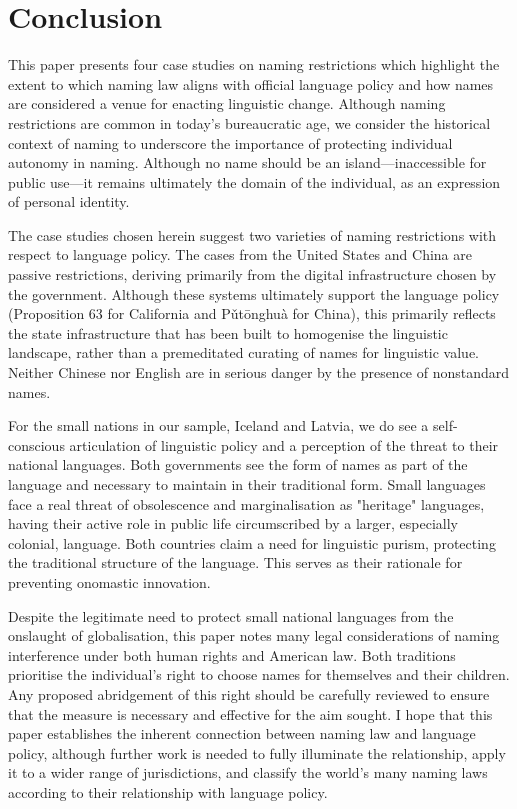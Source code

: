 \section{Conclusion}

This paper presents four case studies on naming restrictions which highlight
the extent to which naming law aligns with official language policy and how
names are considered a venue for enacting linguistic change. Although naming
restrictions are common in today's bureaucratic age, we consider the historical
context of naming to underscore the importance of protecting individual
autonomy in naming. Although no name should be an island---inaccessible for
public use---it remains ultimately the domain of the individual, as an
expression of personal identity.

The case studies chosen herein suggest two varieties of naming restrictions
with respect to language policy. The cases from the United States and China are
passive restrictions, deriving primarily from the digital infrastructure chosen
by the government. Although these systems ultimately support the language
policy (Proposition 63 for California and Pǔtōnghuà for China), this primarily
reflects the state infrastructure that has been built to homogenise the
linguistic landscape, rather than a premeditated curating of names for
linguistic value. Neither Chinese nor English are in serious danger by the
presence of nonstandard names.

For the small nations in our sample, Iceland and Latvia, we do see a
self-conscious articulation of linguistic policy and a perception of the threat
to their national languages. Both governments see the form of names as part of
the language and necessary to maintain in their traditional form. Small
languages face a real threat of obsolescence and marginalisation as "heritage"
languages, having their active role in public life circumscribed by a larger,
especially colonial, language. Both countries claim a need for linguistic
purism, protecting the traditional structure of the language. This serves as
their rationale for preventing onomastic innovation. 

Despite the legitimate need to protect small national languages from the
onslaught of globalisation, this paper notes many legal considerations of
naming interference under both human rights and American law. Both traditions
prioritise the individual's right to choose names for themselves and their
children. Any proposed abridgement of this right should be carefully reviewed
to ensure that the measure is necessary and effective for the aim sought. I
hope that this paper establishes the inherent connection between naming law and
language policy, although further work is needed to fully illuminate the
relationship, apply it to a wider range of jurisdictions, and classify the
world's many naming laws according to their relationship with language policy.

